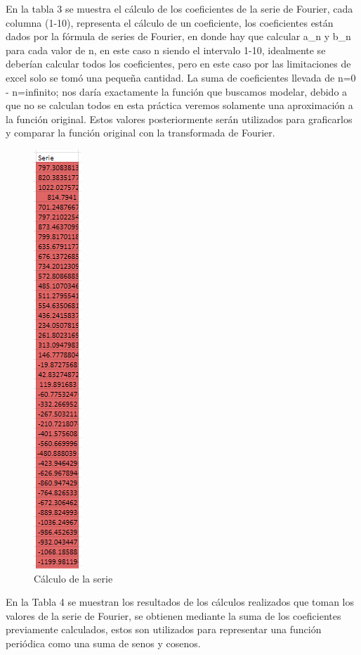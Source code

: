 En la tabla 3 se muestra el cálculo de los coeficientes de la serie de Fourier, cada columna (1-10), representa el cálculo de un coeficiente, los coeficientes están dados por la fórmula de series de Fourier, en donde hay que calcular a\_n y b\_n para cada valor de n, en este caso n siendo el intervalo 1-10, idealmente se deberían calcular todos los coeficientes, pero en este caso por las limitaciones de excel solo se tomó una pequeña cantidad. La suma de coeficientes llevada de n=0 - n=infinito; nos daría exactamente la función que buscamos modelar, debido a que no se calculan todos en esta práctica veremos solamente una aproximación a la función original. Estos valores posteriormente serán utilizados para graficarlos y comparar la función original con la transformada de Fourier.

\begin{figure}[H]
    \centering
    \includegraphics[width=0.69792in,height=6.19792in]{media/image28.png}
    \caption{Cálculo de la serie}
\end{figure}
En la Tabla 4 se muestran los resultados de los cálculos realizados que toman los valores de la serie de Fourier, se obtienen mediante la suma de los coeficientes previamente calculados, estos son utilizados para representar una función periódica como una suma de senos y cosenos.
